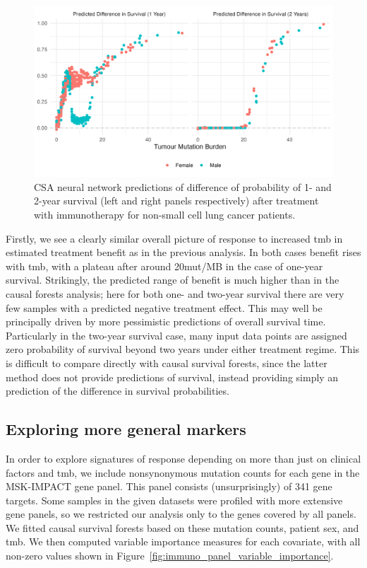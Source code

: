 \documentclass[../thesis.tex]{subfiles}
\begin{document}
\begin{figure}[!tpb] 
\centering
\includegraphics[width=\textwidth]{figures/chapter4/train_samples_nn_predictions.png} 

\caption{CSA neural network predictions of difference of probability of 1- and 2-year survival (left and right panels respectively) after treatment with immunotherapy for non-small cell lung cancer patients. \label{fig:immuno_train_samples_nn_hte_predictions}}
\end{figure}

Firstly, we see a clearly similar overall picture of response to increased \gls{tmb} in estimated treatment benefit as in the previous analysis. In both cases benefit rises with \gls{tmb}, with a plateau after around 20mut/MB in the case of one-year survival. Strikingly, the predicted range of benefit is much higher than in the causal forests analysis; here for both one- and two-year survival there are very few samples with a predicted negative treatment effect. This may well be principally driven by more pessimistic predictions of overall survival time. Particularly in the two-year survival case, many input data points are assigned zero probability of survival beyond two years under either treatment regime. This is difficult to compare directly with causal survival forests, since the latter method does not provide predictions of survival, instead providing simply an prediction of the difference in survival probabilities.




\subsection{Exploring more general markers}
In order to explore signatures of response depending on more than just on clinical factors and \gls{tmb}, we include nonsynonymous mutation counts for each gene in the MSK-IMPACT gene panel. This panel consists (unsurprisingly) of 341 gene targets. Some samples in the given datasets were profiled with more extensive gene panels, so we restricted our analysis only to the genes covered by all panels. We fitted causal survival forests based on these mutation counts, patient sex, and \gls{tmb}. We then computed variable importance measures for each covariate, with all non-zero values shown in Figure~\ref{fig:immuno_panel_variable_importance}. 
\end{document}
